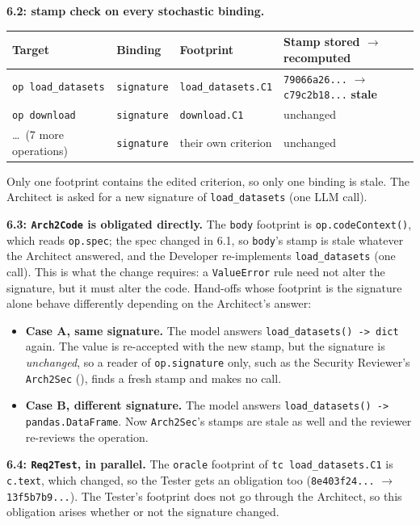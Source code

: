 \documentclass[10pt,a4paper]{article}
\newcommand{\code}[1]{\texttt{#1}}
\theoremstyle{definition}
\newcommand{\what}[1]{\par\smallskip\noindent\textbf{#1}\quad}
\begin{document}
\what{6.2: stamp check on every stochastic binding.}

\begin{center}\small
\begin{tabular}{@{}l l l l@{}}
\toprule
Target & Binding & Footprint & Stamp stored $\rightarrow$ recomputed \\
\midrule
\code{op load_datasets} & \code{signature} & \code{load_datasets.C1} & \code{79066a26...} $\rightarrow$ \code{c79c2b18...} \textbf{stale} \\
\code{op download} & \code{signature} & \code{download.C1} & unchanged \\
\ldots\ (7 more operations) & \code{signature} & their own criterion & unchanged \\
\bottomrule
\end{tabular}
\end{center}

Only one footprint contains the edited criterion, so only one binding is
stale. The Architect is asked for a new signature of \code{load_datasets}
(one LLM call).

\what{6.3: \code{Arch2Code} is obligated directly.} The \code{body}
footprint is \code{op.codeContext()}, which reads \code{op.spec}; the spec
changed in 6.1, so \code{body}'s stamp is stale whatever the Architect
answered, and the Developer re-implements \code{load_datasets} (one call).
This is what the change requires: a \code{ValueError} rule need not alter
the signature, but it must alter the code. Hand-offs whose footprint is the
signature alone behave differently depending on the Architect's answer:

\begin{itemize}
\item \textbf{Case A, same signature.} The model answers
\code{load_datasets() -> dict} again. The value is re-accepted with the new
stamp, but the signature is \emph{unchanged}, so a reader of
\code{op.signature} only, such as the Security Reviewer's \code{Arch2Sec}
(), finds a fresh stamp and makes no call.
\item \textbf{Case B, different signature.} The model answers
\code{load_datasets() -> pandas.DataFrame}. Now \code{Arch2Sec}'s stamps are
stale as well and the reviewer re-reviews the operation.
\end{itemize}

\what{6.4: \code{Req2Test}, in parallel.} The \code{oracle} footprint of
\code{tc load_datasets.C1} is \code{c.text}, which changed, so the Tester
gets an obligation too (\code{8e403f24...} $\rightarrow$ \code{13f5b7b9...}).
The Tester's footprint does not go through the Architect, so this obligation
arises whether or not the signature changed.
\end{document}
